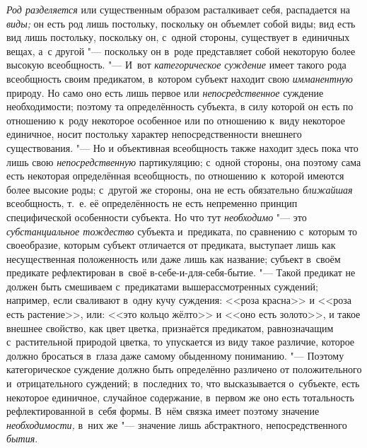 {\em Род разделяется} или существенным образом расталкивает себя,
распадается на {\em виды;} он есть род
лишь постольку, поскольку он объемлет собой виды; вид есть вид лишь
постольку, поскольку он, с~одной стороны, существует в~единичных вещах, а~с
другой "--- поскольку он в~роде представляет собой некоторую
более высокую всеобщность. "--- И~вот {\em категорическое суждение}
имеет такого рода всеобщность своим предикатом, в~котором
субъект находит свою {\em имманентную}
природу. Но само оно есть лишь первое или {\em непосредственное}
суждение необходимости; поэтому та определённость субъекта, в
силу которой он есть по отношению к~роду некоторое особенное или по
отношению к~виду некоторое единичное, носит постольку характер
непосредственности внешнего существования. "--- Но и
объективная всеобщность также находит здесь пока что лишь
свою {\em непосредственную}
партикуляцию; с~одной стороны, она поэтому сама есть
некоторая определённая всеобщность, по отношению к~которой имеются более
высокие роды; с~другой же стороны, она не есть обязательно {\em ближайшая}
всеобщность, т.~е. её определённость не есть непременно
принцип специфической особенности субъекта. Но что тут
{\em необходимо} "--- это {\em субстанциальное тождество}
субъекта и~предиката, по сравнению с~которым то своеобразие,
которым субъект отличается от предиката, выступает лишь как несущественная
положенность или даже лишь как название; субъект в~своём предикате
рефлектирован в~своё в-себе-и-для-себя-бытие. "--- Такой
предикат не должен быть смешиваем с~предикатами вышерассмотренных суждений;
например, если сваливают в~одну кучу суждения: <<роза красна>> и
<<роза есть растение>>, или: <<это кольцо жёлто>> и <<оно есть золото>>,
и такое внешнее свойство, как цвет цветка, признаётся
предикатом, равнозначащим с~растительной природой цветка, то упускается из
виду такое различие, которое должно бросаться в~глаза даже самому
обыденному пониманию. "--- Поэтому категорическое суждение
должно быть определённо различено от положительного и~отрицательного
суждений; в~последних то, что высказывается о~субъекте, есть некоторое
единичное, случайное содержание, в~первом же оно есть тотальность
рефлектированной в~себя формы. В~нём связка имеет поэтому значение
{\em необходимости,} в~них же "--- значение лишь абстрактного,
непосредственного {\em бытия}.


